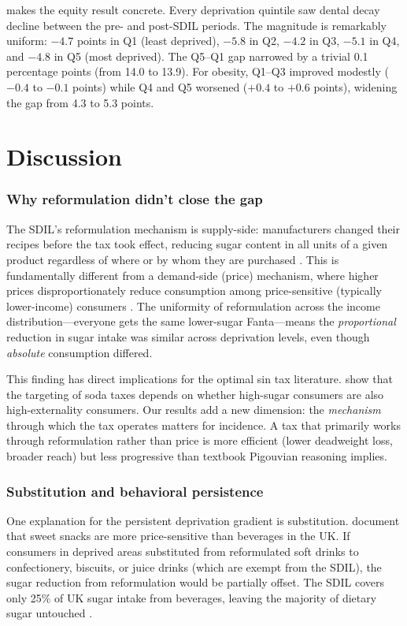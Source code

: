 \documentclass[12pt]{article}
\begin{document}
 makes the equity result concrete. Every deprivation quintile saw dental decay decline between the pre- and post-SDIL periods. The magnitude is remarkably uniform: $-4.7$ points in Q1 (least deprived), $-5.8$ in Q2, $-4.2$ in Q3, $-5.1$ in Q4, and $-4.8$ in Q5 (most deprived). The Q5--Q1 gap narrowed by a trivial 0.1 percentage points (from 14.0 to 13.9). For obesity, Q1--Q3 improved modestly ($-0.4$ to $-0.1$ points) while Q4 and Q5 worsened ($+0.4$ to $+0.6$ points), widening the gap from 4.3 to 5.3 points.



\section{Discussion}
\label{sec:discussion}

\subsubsection*{Why reformulation didn't close the gap} The SDIL's reformulation mechanism is supply-side: manufacturers changed their recipes before the tax took effect, reducing sugar content in all units of a given product regardless of where or by whom they are purchased \citep{bandy2020}. This is fundamentally different from a demand-side (price) mechanism, where higher prices disproportionately reduce consumption among price-sensitive (typically lower-income) consumers \citep{allcott2019}. The uniformity of reformulation across the income distribution---everyone gets the same lower-sugar Fanta---means the \textit{proportional} reduction in sugar intake was similar across deprivation levels, even though \textit{absolute} consumption differed.

This finding has direct implications for the optimal sin tax literature. \citet{dubois2020} show that the targeting of soda taxes depends on whether high-sugar consumers are also high-externality consumers. Our results add a new dimension: the \textit{mechanism} through which the tax operates matters for incidence. A tax that primarily works through reformulation rather than price is more efficient (lower deadweight loss, broader reach) but less progressive than textbook Pigouvian reasoning implies.

\subsubsection*{Substitution and behavioral persistence} One explanation for the persistent deprivation gradient is substitution. \citet{smith2018} document that sweet snacks are more price-sensitive than beverages in the UK. If consumers in deprived areas substituted from reformulated soft drinks to confectionery, biscuits, or juice drinks (which are exempt from the SDIL), the sugar reduction from reformulation would be partially offset. The SDIL covers only 25\% of UK sugar intake from beverages, leaving the majority of dietary sugar untouched \citep{swinburn2019}.
\end{document}
